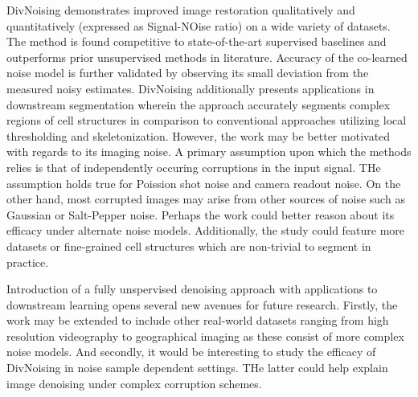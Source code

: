 \documentclass[11pt,letterpaper]{article}
\begin{document}
DivNoising demonstrates improved image restoration qualitatively and quantitatively (expressed as Signal-NOise ratio) on a wide variety of datasets. The method is found competitive to state-of-the-art supervised baselines and outperforms prior unsupervised methods in literature. Accuracy of the co-learned noise model is further validated by observing its small deviation from the measured noisy estimates. DivNoising additionally presents applications in downstream segmentation wherein the approach accurately segments complex regions of cell structures in comparison to conventional approaches utilizing local thresholding and skeletonization. However, the work may be better motivated with regards to its imaging noise. A primary assumption upon which the methods relies is that of independently occuring corruptions in the input signal. THe assumption holds true for Poission shot noise and camera readout noise. On the other hand, most corrupted images may arise from other sources of noise such as Gaussian or Salt-Pepper noise. Perhaps the work could better reason about its efficacy under alternate noise models. Additionally, the study could feature more datasets or fine-grained cell structures which are non-trivial to segment in practice. 

Introduction of a fully unspervised denoising approach with applications to downstream learning opens several new avenues for future research. Firstly, the work may be extended to include other real-world datasets ranging from high resolution videography to geographical imaging as these consist of more complex noise models. And secondly, it would be interesting to study the efficacy of DivNoising in noise sample dependent settings. THe latter could help explain image denoising under complex corruption schemes. 
\end{document}
